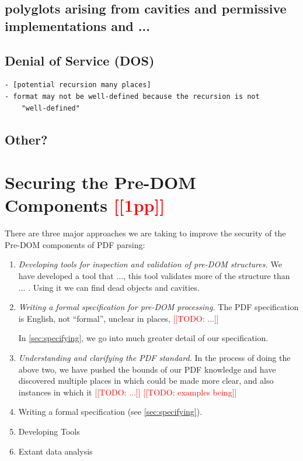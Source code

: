 \documentclass[conference,12pt]{IEEEtran}
\newcommand{\note}[1]{\noteYes{#1}}
\newcommand{\noteYes}[1]{\textcolor{red}{[[#1]]}}
\newcommand{\todo}[1]{\note{TODO: #1}}
\begin{document}
\subsection{polyglots arising from cavities and permissive implementations and ...}

\subsection{Denial of Service (DOS)}

\begin{lstlisting}[style=meta]
- [potential recursion many places]
- format may not be well-defined because the recursion is not
    "well-defined"
\end{lstlisting}

\subsection{Other?}

\section{Securing the Pre-DOM Components \note{1pp}}
\label{sec:securing}

There are three major approaches we are taking to improve the security of the
Pre-DOM components of PDF parsing:
\begin{enumerate}
\item
  \emph{Developing tools for inspection and validation of pre-DOM structures.}
  We have developed a tool that ..., this tool validates more of the structure
  than ... .  Using it we can find dead objects and cavities. 
   
\item
  \emph{Writing a formal specification for pre-DOM processing.}
  The PDF specification \cite{isotc171sc2wg8ISO32000220202020}
  is English, not ``formal'', unclear
  in places, \todo{...}

  In \cref{sec:specifying}, we go into much greater detail of our specification.

\item
  \emph{Understanding and clarifying the PDF standard.}
  In the process of doing the above two, we have pushed the bounds
  of our PDF knowledge and have discovered multiple places in which
  \cite{isotc171sc2wg8ISO32000220202020} could be made more clear, and also instances in which
  it \todo{...}
  \todo{examples being}
 \item Writing a formal specification (see \cref{sec:specifying}).

 \item Developing Tools
 
 \item Extant data analysis

\end{enumerate}
\end{document}
